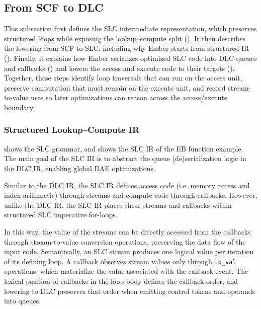\subsection{From SCF to DLC} \label{sec:scf-to-dlc} %



This subsection first defines the SLC intermediate representation, which preserves structured loops while exposing the lookup--compute split ().
It then describes the lowering from SCF to SLC, including why Ember starts from structured IR ().
Finally, it explains how Ember serializes optimized SLC code into DLC queues and callbacks () and lowers the access and execute code to their targets ().
Together, these steps identify loop traversals that can run on the access unit, preserve computation that must remain on the execute unit, and record stream-to-value uses so later optimizations can reason across the access/execute boundary.

\subsubsection{Structured Lookup--Compute IR} \label{sec:slc-ir} %

 shows the SLC grammar, and  shows the SLC IR of the EB function example. The main goal of the SLC IR is to abstract the queue (de)serialization logic in the DLC IR, enabling global DAE optimizations.

Similar to the DLC IR, the SLC IR defines access code (i.e. memory access and index arithmetic) through streams and compute code through callbacks. However, unlike the DLC IR, the SLC IR places these streams and callbacks within structured SLC imperative for-loops.

In this way, the value of the streams can be directly accessed from the callbacks through stream-to-value conversion operations, preserving the data flow of the input code. Semantically, an SLC stream produces one logical value per iteration of its defining loop. A callback observes stream values only through \texttt{to\_val} operations, which materialize the value associated with the callback event. The lexical position of callbacks in the loop body defines the callback order, and lowering to DLC preserves that order when emitting control tokens and operands into queues.

